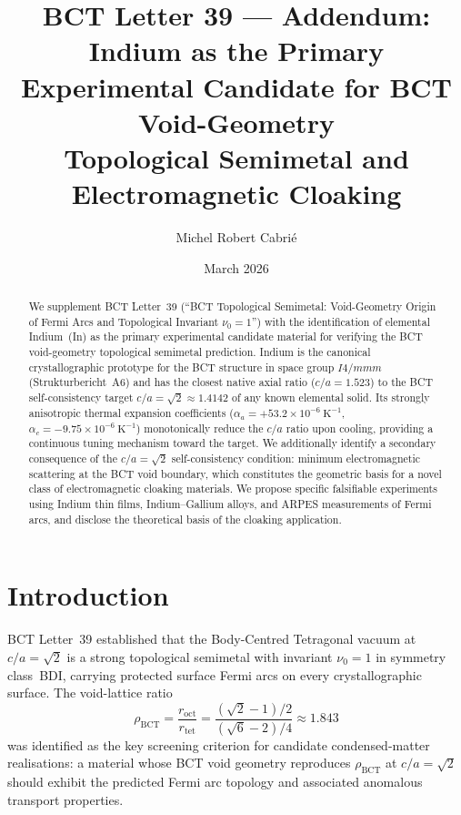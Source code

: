 \documentclass[aps,prl,twocolumn,superscriptaddress,floatfix]{revtex4-2}
\begin{document}
\title{BCT Letter 39 — Addendum: Indium as the Primary\\
Experimental Candidate for BCT Void-Geometry\\
Topological Semimetal and Electromagnetic Cloaking}

\author{Michel Robert Cabri\'{e}}

\date{March 2026}

\begin{abstract}
We supplement BCT Letter~39 (``BCT Topological Semimetal:
Void-Geometry Origin of Fermi Arcs and Topological Invariant $\nu_0=1$'')
with the identification of elemental Indium~(In) as the primary
experimental candidate material for verifying the BCT void-geometry
topological semimetal prediction.
Indium is the canonical crystallographic prototype for the BCT
structure in space group $I4/mmm$ (Strukturbericht~A6) and has the
closest native axial ratio ($c/a = 1.523$) to the BCT self-consistency
target $c/a = \sqrt{2} \approx 1.4142$ of any known elemental solid.
Its strongly anisotropic thermal expansion coefficients
($\alpha_a = +53.2\times10^{-6}\ \mathrm{K}^{-1}$,
$\alpha_c = -9.75\times10^{-6}\ \mathrm{K}^{-1}$)
monotonically reduce the $c/a$ ratio upon cooling, providing a
continuous tuning mechanism toward the target.
We additionally identify a secondary consequence of the $c/a = \sqrt{2}$
self-consistency condition: minimum electromagnetic scattering at the
BCT void boundary, which constitutes the geometric basis for a novel
class of electromagnetic cloaking materials.
We propose specific falsifiable experiments using Indium thin films,
Indium--Gallium alloys, and ARPES measurements of Fermi arcs,
and disclose the theoretical basis of the cloaking application.
\end{abstract}

\maketitle

\section{Introduction}

BCT Letter~39 established that the Body-Centred Tetragonal vacuum
at $c/a = \sqrt{2}$ is a strong topological semimetal with invariant
$\nu_0 = 1$ in symmetry class~BDI, carrying protected surface Fermi
arcs on every crystallographic surface.
The void-lattice ratio
\begin{equation}
  \rho_{\mathrm{BCT}} = \frac{r_{\mathrm{oct}}}{r_{\mathrm{tet}}}
  = \frac{(\sqrt{2}-1)/2}{(\sqrt{6}-2)/4} \approx 1.843
  \label{eq:rho}
\end{equation}
was identified as the key screening criterion for candidate condensed-matter
realisations: a material whose BCT void geometry reproduces $\rho_{\mathrm{BCT}}$
at $c/a = \sqrt{2}$ should exhibit the predicted Fermi arc topology
and associated anomalous transport properties.
\end{document}
